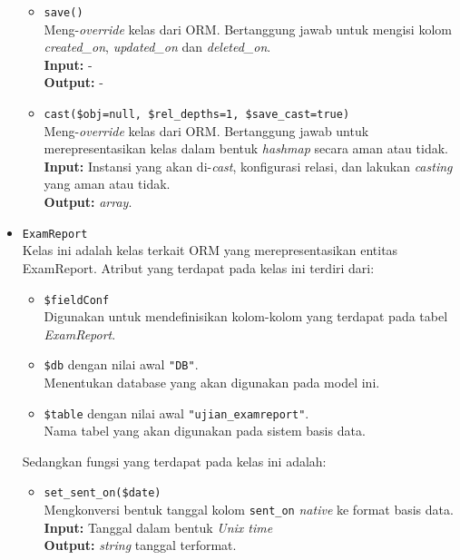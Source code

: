 \begin{itemize}
\begin{itemize}
                \item \texttt{save()}\\
                    Meng-\textit{override} kelas dari ORM. Bertanggung jawab
                    untuk mengisi kolom \textit{created\_on},
                    \textit{updated\_on} dan \textit{deleted\_on}.\\
                    \textbf{Input:} -\\
                    \textbf{Output:} -
                
                \item \texttt{cast(\$obj=null, \$rel\_depths=1,
                \$save\_cast=true)}\\
                    Meng-\textit{override} kelas dari ORM. Bertanggung jawab
                    untuk merepresentasikan kelas dalam bentuk \textit{hashmap}
                    secara aman atau tidak. \\
                    \textbf{Input:} Instansi yang akan di-\textit{cast},
                        konfigurasi relasi, dan lakukan \textit{casting} yang
                        aman atau tidak.\\
                    \textbf{Output:} \textit{array}.
            \end{itemize}
            
        \item \texttt{ExamReport} \\
            Kelas ini adalah kelas terkait ORM yang merepresentasikan entitas
            ExamReport. Atribut yang terdapat pada kelas ini terdiri dari:
            \begin{itemize}
                \item \texttt{\$fieldConf} \\
                    Digunakan untuk mendefinisikan kolom-kolom yang terdapat
                    pada tabel \textit{ExamReport}.
                \item \texttt{\$db} dengan nilai awal \texttt{"DB"}. \\
                    Menentukan database yang akan digunakan pada model ini.
                \item \texttt{\$table} dengan nilai awal
                \texttt{"ujian\_examreport"}. \\
                    Nama tabel yang akan digunakan pada sistem basis data. 
            \end{itemize}
            Sedangkan fungsi yang terdapat pada kelas ini adalah:
            \begin{itemize}
                \item \texttt{set\_sent\_on(\$date)} \\
                    Mengkonversi bentuk tanggal kolom \texttt{sent\_on}
                    \textit{native} ke format basis data. \\
                    \textbf{Input:} Tanggal dalam bentuk \textit{Unix time}\\
                    \textbf{Output:} \textit{string} tanggal terformat.
                    

\end{itemize}
\end{itemize}
